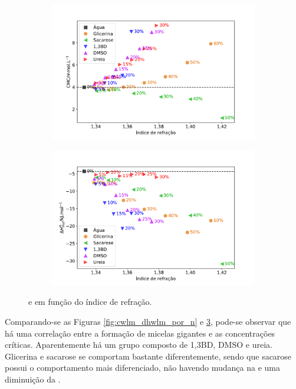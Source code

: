 		\begin{figure}[h]
			\begin{subfigure}[t]{0.5\textwidth}
				\centering
				\includegraphics[width=\textwidth]{imagens/itc/CMC_por_n}
				\caption{\cmc}
				\label{fig:cmc_por_n}
			\end{subfigure} %
			\begin{subfigure}[t]{0.5\textwidth}
				\centering
				\includegraphics[width=\textwidth]{imagens/itc/DH_por_n}
				\caption{\DHmic}
				\label{fig:dh_por_n}
			\end{subfigure}
			
			\caption{\cmc{} e \DHmic{} em função do índice de refração.}
			\label{fig:cmc_dh_por_n}
		\end{figure}

		Comparando-se as Figuras \ref{fig:cwlm_dhwlm_por_n} e \ref{fig:cmc_dh_por_n}, pode-se observar que há uma correlação entre a formação de micelas gigantes e as concentrações críticas. Aparentemente há um grupo composto de 1,3BD, DMSO e ureia. Glicerina e sacarose se comportam bastante diferentemente, sendo que sacarose possui o comportamento mais diferenciado, não havendo mudança na \cwlm{} e uma diminuição da \cmc{}.
		
